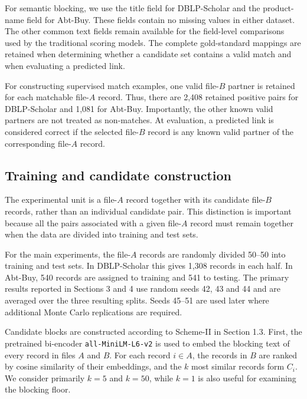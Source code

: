 For semantic blocking, we use the title field for DBLP-Scholar and the
product-name field for Abt-Buy. These fields contain no missing values in
either dataset. The other common text fields remain available for the field-level comparisons
used by the traditional scoring models. The complete
gold-standard mappings are retained when determining whether a candidate
set contains a valid match and when evaluating a predicted link.

For constructing supervised match examples, one valid file-$B$ partner is
retained for each matchable file-$A$ record. Thus, there are 2,408 retained
positive pairs for DBLP-Scholar and 1,081 for Abt-Buy. Importantly, the
other known valid partners are not treated as non-matches. At evaluation,
a predicted link is considered correct if the selected file-$B$ record is
any known valid partner of the corresponding file-$A$ record.


\subsection{Training and candidate construction}
\label{sec:training-candidates}

The experimental unit is a file-$A$ record together with its candidate
file-$B$ records, rather than an individual candidate pair. This distinction
is important because all the pairs associated with a given file-$A$ record
must remain together when the data are divided into training and test sets.

For the main experiments, the file-$A$ records are randomly divided 50--50
into training and test sets. In DBLP-Scholar this gives 1,308 records in
each half. In Abt-Buy, 540 records are assigned to training and 541 to
testing. The primary results reported in Sections 3 and 4 use random seeds
42, 43 and 44 and are averaged over the three resulting splits. 
Seeds 45--51 are used later where additional Monte Carlo replications are
required.

Candidate blocks are constructed according to Scheme-II in Section 1.3.
First, the pretrained bi-encoder \texttt{all-MiniLM-L6-v2} is used to
embed the blocking text of every record in files $A$ and $B$. For each
record $i\in A$, the records in $B$ are ranked by cosine similarity of
their embeddings, and the $k$ most similar records form $C_i$. We consider
primarily $k=5$ and $k=50$, while $k=1$ is also useful for examining the
blocking floor.

